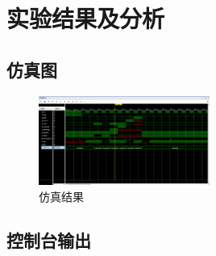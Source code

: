 \section{实验结果及分析}
\subsection{仿真图}
\begin{figure}[htbp]
    \centering
    \includegraphics[width=0.5\textwidth]{image/15.png}
    \caption{仿真结果}
    \label{fig:my_label}
\end{figure}
\subsection{控制台输出}